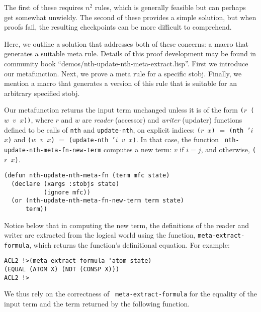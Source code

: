 \noindent The first of these requires $n^2$ rules, which is generally feasible
but can perhaps get somewhat unwieldy.  The second of these provides a
simple solution, but when proofs fail, the resulting checkpoints can
be more difficult to comprehend.

Here, we outline a solution that addresses both of these concerns: a
macro that generates a suitable meta rule.  Details of this proof
development may be found in community book
``demos/\allowbreak{}nth-update-nth-meta-extract.lisp''.
First we introduce our metafunction.  Next, we prove a meta rule for a
specific stobj.  Finally, we mention a macro that generates a version
of this rule that is suitable for an arbitrary specified stobj.

Our metafunction returns the input term unchanged unless it is of the
form {\tt ($r$ ($w$ $v$ $x$))}, where $r$ and $w$ are {\em reader}
(accessor) and {\em writer} (updater) functions defined to be calls of
{\tt nth} and {\tt update-nth}, on explicit indices: {\tt ($r$ $x$)}
$=$ {\tt (nth '$i$ $x$)} and {\tt ($w$ $v$ $x$)} $=$ {\tt (update-nth
  '$i$ $v$ $x$)}.  In that case, the function {\tt
  nth-update-nth-meta-fn-new-term} computes a new term: $v$ if $i =
j$, and otherwise, {\tt ($r$ $x$)}.

\begin{verbatim}
(defun nth-update-nth-meta-fn (term mfc state)
  (declare (xargs :stobjs state)
           (ignore mfc))
  (or (nth-update-nth-meta-fn-new-term term state)
      term))
\end{verbatim}

Notice below that in computing the new term, the definitions of the
reader and writer are extracted from the logical world using the
function, {\tt meta-extract-formula}, which returns the function's
definitional equation.  For example:

\begin{verbatim}
ACL2 !>(meta-extract-formula 'atom state)
(EQUAL (ATOM X) (NOT (CONSP X)))
ACL2 !>
\end{verbatim}

\noindent We thus rely on the correctness of {\tt
  meta-extract-formula} for the equality of the input term and the
term returned by the following function.

